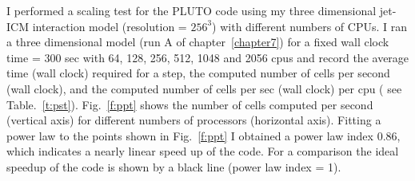 
I performed a scaling test for the PLUTO code using my three dimensional jet-ICM interaction model (resolution = $256^3$) with different numbers of CPUs. I ran a three dimensional model (run A of chapter~\ref{chapter7}) for a fixed wall clock time = 300 sec with 64, 128, 256, 512, 1048 and 2056 cpus and record the average time (wall clock) required for a step, the computed number of cells per second (wall clock), and the computed number of cells per sec (wall clock) per cpu ( see Table.~\ref{t:pst}). Fig.~\ref{f:ppt} shows the number of cells computed per second (vertical axis) for different numbers of processors (horizontal axis). Fitting a power law to the points shown in Fig.~\ref{f:ppt} I obtained a power law index 0.86, which indicates a nearly linear speed up of the code. For a comparison the ideal speedup of the code is shown by a black line (power law index = 1). 



